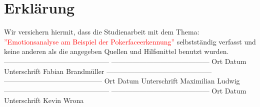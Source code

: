 \documentclass[12pt, a4paper]{report}
\begin{document}

\setlength{\parindent}{0em} 
\let\cleardoublepage\relax
{}


\section*{Erklärung}
Wir versichern hiermit, dass die Studienarbeit mit dem Thema: \textcolor{red}{''Emotionsanalyse am Beispiel der Pokerfaceerkennung''} selbstständig verfasst und keine anderen als die angegeben Quellen und Hilfsmittel benutzt wurden.
\newline
\newline
\newline
\newline
---------------------------------------------       ------------------------------------------ \newline
Ort	\hspace{2cm}		Datum\hspace{3,5 cm}				    Unterschrift Fabian Brandmüller
\newline
\newline
\newline
---------------------------------------------       ------------------------------------------ \newline
Ort	\hspace{2cm}		Datum\hspace{3,5 cm}				    Unterschrift Maximilian Ludwig
\newline
\newline
\newline
---------------------------------------------       ------------------------------------------ \newline
Ort	\hspace{2cm}		Datum\hspace{3,5 cm}				    Unterschrift Kevin Wrona
\newpage
\end{document}
